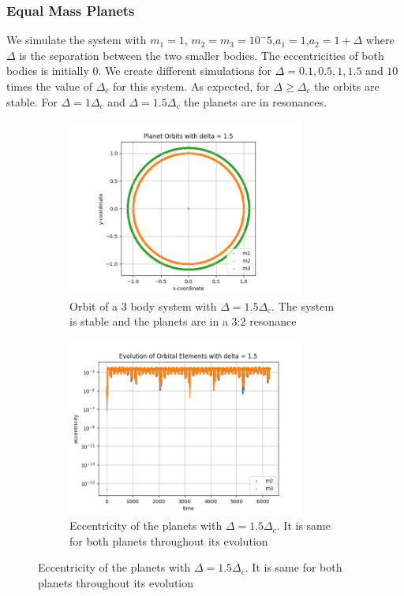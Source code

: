 \documentclass[12pt,a4paper]{article}
\begin{document}
\subsubsection{Equal Mass Planets}
We  simulate the system with $m_1=1$, $m_2=m_3=10^-5$,$a_1=1$,$a_2=1+\Delta$ where $\Delta$ is the separation between the two smaller bodies. The eccentricities of both bodies is initially 0. We create different simulations for
$\Delta = 0.1, 0.5, 1, 1.5$ and $10$ times the value of $\Delta_c$ for this system.
As expected, for $\Delta\geq\Delta_c$ the orbits are stable. For $\Delta=1\Delta_c$ and $\Delta=1.5\Delta_c$ the planets are in resonances.
\begin{figure}[H]
  \begin{subfigure}{0.49\textwidth}
    \centering
    \includegraphics[height = 2.3in]{3Body/3BD_orbit_delta1.5.png}
    \caption{Orbit of a 3 body system with $\Delta = 1.5\Delta_c$. The system is stable and the planets are in a 3:2 resonance}
    \label{fig:3Body_1.5}
  \end{subfigure}
  \begin{subfigure}{0.49\textwidth}
    \centering
    \includegraphics[height = 2.3in]{3Body/3BD_ecc_delta1.5.png}
    \caption{Eccentricity of the planets with $\Delta = 1.5\Delta_c$. It is same for both planets throughout its evolution}
    \label{fig:3Body_1.5_ecc}
  \end{subfigure}
  

\end{figure}
\end{document}
